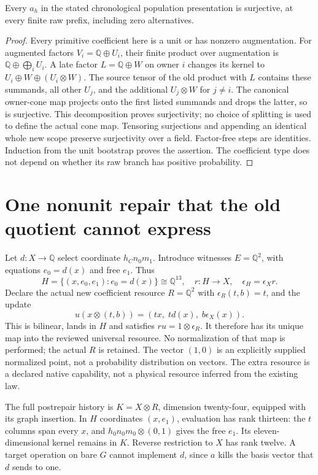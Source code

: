 \documentclass{article}
\begin{document}
\begin{proposition}
Every $a_h$ in the stated chronological population presentation is surjective, at every finite raw prefix, including zero alternatives.
\end{proposition}
\begin{proof}
Every primitive coefficient here is a unit or has nonzero augmentation. For augmented factors $V_i=\mathbb Q\oplus U_i$, their finite product over augmentation is $\mathbb Q\oplus\bigoplus_i U_i$. A late factor $L=\mathbb Q\oplus W$ on owner $i$ changes its kernel to $U_i\oplus W\oplus(U_i\otimes W)$. The source tensor of the old product with $L$ contains these summands, all other $U_j$, and the additional $U_j\otimes W$ for $j\ne i$. The canonical owner-cone map projects onto the first listed summands and drops the latter, so is surjective. This decomposition proves surjectivity; no choice of splitting is used to define the actual cone map. Tensoring surjections and appending an identical whole new scope preserve surjectivity over a field. Factor-free steps are identities. Induction from the unit bootstrap proves the assertion. The coefficient type does not depend on whether its raw branch has positive probability.\end{proof}

\section{One nonunit repair that the old quotient cannot express}
Let $d:X\to\mathbb Q$ select coordinate $h_Cn_0m_1$. Introduce witnesses $E=\mathbb Q^2$, with equations $e_0=d(x)$ and free $e_1$. Thus
\[
 H=\{(x,e_0,e_1):e_0=d(x)\}\cong\mathbb Q^{13},\quad
 r:H\to X,\quad\epsilon_H=\epsilon_Xr.
\]
Declare the actual new coefficient resource $R=\mathbb Q^2$ with $\epsilon_R(t,b)=t$, and the update
\[
 u(x\otimes(t,b))=(tx,\;t d(x),\;b\epsilon_X(x)).           \tag{1}
\]
This is bilinear, lands in $H$ and satisfies $ru=1\otimes\epsilon_R$. It therefore has its unique map into the reviewed universal resource. No normalization of that map is performed; the actual $R$ is retained. The vector $(1,0)$ is an explicitly supplied normalized point, not a probability distribution on vectors. The extra resource is a declared native capability, not a physical resource inferred from the existing law.

The full postrepair history is $K=X\otimes R$, dimension twenty-four, equipped with its graph insertion. In $H$ coordinates $(x,e_1)$, evaluation has rank thirteen: the $t$ columns span every $x$, and $h_0n_0m_0\otimes(0,1)$ gives the free $e_1$. Its eleven-dimensional kernel remains in $K$. Reverse restriction to $X$ has rank twelve. A target operation on bare $G$ cannot implement $d$, since $a$ kills the basis vector that $d$ sends to one.
\end{document}
